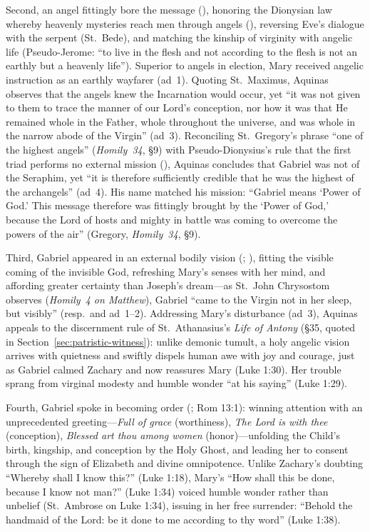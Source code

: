 Second, an angel fittingly bore the message (), honoring the Dionysian law whereby heavenly mysteries reach men through angels (), reversing Eve's dialogue with the serpent (St.~Bede), and matching the kinship of virginity with angelic life (Pseudo-Jerome: ``to live in the flesh and not according to the flesh is not an earthly but a heavenly life''). Superior to angels in election, Mary received angelic instruction as an earthly wayfarer (ad~1). Quoting St.~Maximus, Aquinas observes that the angels knew the Incarnation would occur, yet ``it was not given to them to trace the manner of our Lord's conception, nor how it was that He remained whole in the Father, whole throughout the universe, and was whole in the narrow abode of the Virgin'' (ad~3). Reconciling St.~Gregory's phrase ``one of the highest angels'' (\emph{Homily~34}, \S9) with Pseudo-Dionysius's rule that the first triad performs no external mission (), Aquinas concludes that Gabriel was not of the Seraphim, yet ``it is therefore sufficiently credible that he was the highest of the archangels'' (ad~4). His name matched his mission: ``Gabriel means `Power of God.' This message therefore was fittingly brought by the `Power of God,' because the Lord of hosts and mighty in battle was coming to overcome the powers of the air'' (Gregory, \emph{Homily~34}, \S9).

Third, Gabriel appeared in an external bodily vision (; ), fitting the visible coming of the invisible God, refreshing Mary's senses with her mind, and affording greater certainty than Joseph's dream---as St.~John Chrysostom observes (\emph{Homily~4 on Matthew}), Gabriel ``came to the Virgin not in her sleep, but visibly'' (resp.\ and ad~1--2). Addressing Mary's disturbance (ad~3), Aquinas appeals to the discernment rule of St.~Athanasius's \emph{Life of Antony} (\S35, quoted in Section~\ref{sec:patristic-witness}): unlike demonic tumult, a holy angelic vision arrives with quietness and swiftly dispels human awe with joy and courage, just as Gabriel calmed Zachary and now reassures Mary (Luke 1:30). Her trouble sprang from virginal modesty and humble wonder ``at his saying'' (Luke 1:29).

Fourth, Gabriel spoke in becoming order (; Rom 13:1): winning attention with an unprecedented greeting---\emph{Full of grace} (worthiness), \emph{The Lord is with thee} (conception), \emph{Blessed art thou among women} (honor)---unfolding the Child's birth, kingship, and conception by the Holy Ghost, and leading her to consent through the sign of Elizabeth and divine omnipotence. Unlike Zachary's doubting ``Whereby shall I know this?'' (Luke 1:18), Mary's ``How shall this be done, because I know not man?'' (Luke 1:34) voiced humble wonder rather than unbelief (St.~Ambrose on Luke 1:34), issuing in her free surrender: ``Behold the handmaid of the Lord: be it done to me according to thy word'' (Luke 1:38).

